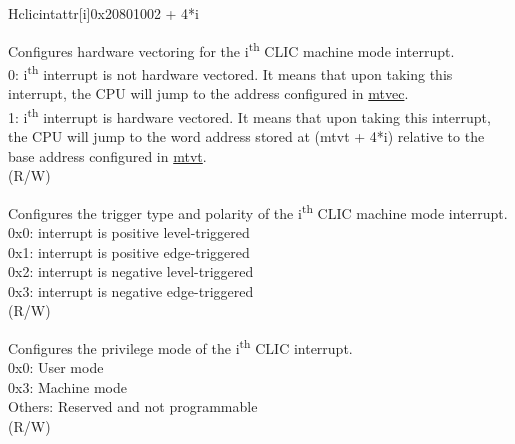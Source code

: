 \begin{register}{H}{{clicintattr[i]}}{0x20801002 + 4*i}\label{regdesc:MCLICINTATTR_REG_i}
%
%
%
%
\regnewline%
\begin{regdesc}
\begin{reglist}
\label{fielddesc:MCLICINTATTR_i_SHV}\item [{SHV}] Configures hardware vectoring for the i\textsuperscript{th} CLIC machine mode interrupt. \\
0: i\textsuperscript{th} interrupt is not hardware vectored. It means that upon taking this interrupt, the CPU will jump to the address configured in \hyperref[fielddesc:MTVECBASE]{mtvec}. \\
1: i\textsuperscript{th} interrupt is hardware vectored. It means that upon taking this interrupt, the CPU will jump to the word address stored at (mtvt + 4*i) relative to the base address configured in \hyperref[fielddesc:MTVTBASE]{mtvt}. \\
(R/W)
\label{fielddesc:MCLICINTATTR_i_TRIG}\item [{TRIG}] Configures the trigger type and polarity of the i\textsuperscript{th} CLIC machine mode interrupt. \\
0x0: interrupt is positive level-triggered \\
0x1: interrupt is positive edge-triggered \\
0x2: interrupt is negative level-triggered \\
0x3: interrupt is negative edge-triggered \\
(R/W)
\label{fielddesc:MCLICINTATTR_i_MODE}\item [{MODE}] Configures the privilege mode of the i\textsuperscript{th} CLIC interrupt. \\
0x0: User mode\\
0x3: Machine mode\\
Others: Reserved and not programmable\\
(R/W)
\end{reglist}
\end{regdesc}
\end{register}

